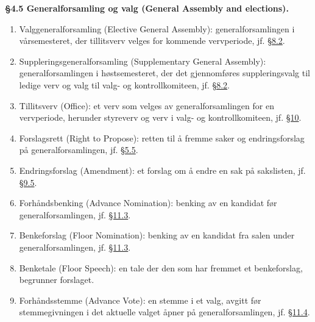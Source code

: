 \documentclass{../../../Common/Latex/Templates/rapport}
\begin{document}
\textbf{\S 4.5 Generalforsamling og valg (General Assembly and elections).}\label{bylaw:4.5}
\begin{enumerate}
  \item Valggeneralforsamling (Elective General Assembly): generalforsamlingen i vårsemesteret, der tillitsverv velges for kommende vervperiode, jf. \hyperref[bylaw:8.2]{\S 8.2}.
  \item Suppleringsgeneralforsamling (Supplementary General Assembly): generalforsamlingen i høstsemesteret, der det gjennomføres suppleringsvalg til ledige verv og valg til valg- og kontrollkomiteen, jf. \hyperref[bylaw:8.2]{\S 8.2}.
  \item Tillitsverv (Office): et verv som velges av generalforsamlingen for en vervperiode, herunder styreverv og verv i valg- og kontrollkomiteen, jf. \hyperref[bylaw:10]{\S 10}.
  \item Forslagsrett (Right to Propose): retten til å fremme saker og endringsforslag på generalforsamlingen, jf. \hyperref[bylaw:5.5]{\S 5.5}.
  \item Endringsforslag (Amendment): et forslag om å endre en sak på sakslisten, jf. \hyperref[bylaw:9.5]{\S 9.5}.
  \item Forhåndsbenking (Advance Nomination): benking av en kandidat før generalforsamlingen, jf. \hyperref[bylaw:11.3]{\S 11.3}.
  \item Benkeforslag (Floor Nomination): benking av en kandidat fra salen under generalforsamlingen, jf. \hyperref[bylaw:11.3]{\S 11.3}.
  \item Benketale (Floor Speech): en tale der den som har fremmet et benkeforslag, begrunner forslaget.
  \item Forhåndsstemme (Advance Vote): en stemme i et valg, avgitt før stemmegivningen i det aktuelle valget åpner på generalforsamlingen, jf. \hyperref[bylaw:11.4]{\S 11.4}.
\end{enumerate}
\end{document}
